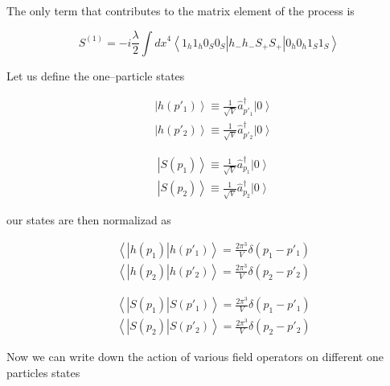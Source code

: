 The only term that contributes to the matrix element of the process is

\begin{equation}
S^{(1)}=-i\frac{\lambda}{2} \int{{dx}^4 \left\langle 1_h 1_h 0_S 0_S|h_- h_- S_+ S_+|0_h 0_h 1_S 1_S \right \rangle}
\end{equation}
 
Let us define the one–particle states

\begin{equation}
\begin{split}
&\left| h(p'_1)\right \rangle \equiv \frac{1}{\sqrt{V}} \hat{a}_{p'_1}^{\dagger} \left| 0 \right \rangle\\ 
&\left| h(p'_2)\right \rangle \equiv \frac{1}{\sqrt{V}} \hat{a}_{p'_2}^{\dagger} \left | 0 \right \rangle
\end{split}
\end{equation}

\begin{equation}
\begin{split}
&\left| S(p_1)\right \rangle \equiv \frac{1}{\sqrt{V}} \hat{a}_{p_1}^{\dagger} \left| 0 \right \rangle\\ 
&\left| S(p_2)\right \rangle \equiv \frac{1}{\sqrt{V}} \hat{a}_{p_2}^{\dagger} \left | 0 \right \rangle
\end{split}
\end{equation}

our states are then normalizad as

\begin{equation}
\begin{split}
&\left\langle| h(p_1) | h(p'_1)\right \rangle = \frac{2\pi^3}{V} \delta (p_1-p'_1)\\
&\left\langle | h(p_2) | h(p'_2)\right \rangle = \frac{2\pi^3}{V} \delta(p_2-p'_2)
\end{split}
\end{equation}

\begin{equation}
\begin{split}
&\left\langle| S(p_1) | S(p'_1)\right \rangle = \frac{2\pi^3}{V} \delta (p_1-p'_1)\\
&\left\langle | S(p_2) | S(p'_2)\right \rangle = \frac{2\pi^3}{V} \delta(p_2-p'_2)
\end{split}
\end{equation}

Now we can write down the action of various field operators on different one particles states

